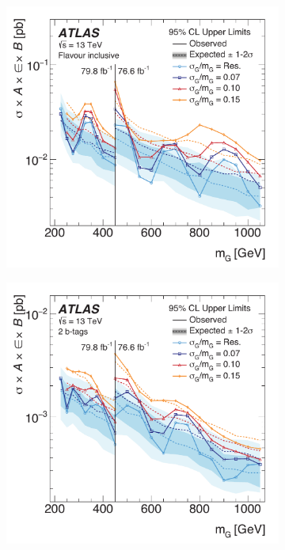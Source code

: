 \begin{figure}
  \centering
  \begin{subfigure}[b]{0.49\textwidth}
    \includegraphics[width=\textwidth]{figures/chapter_dijet/GenericGaussians_CombinedInc}
	  \caption{\label{fig:limit_gaussian_inc}}
  \end{subfigure}
  \begin{subfigure}[b]{0.49\textwidth}
    \includegraphics[width=\textwidth]{figures/chapter_dijet/GenericGaussians_Combined2b}

\end{subfigure}
\end{figure}
